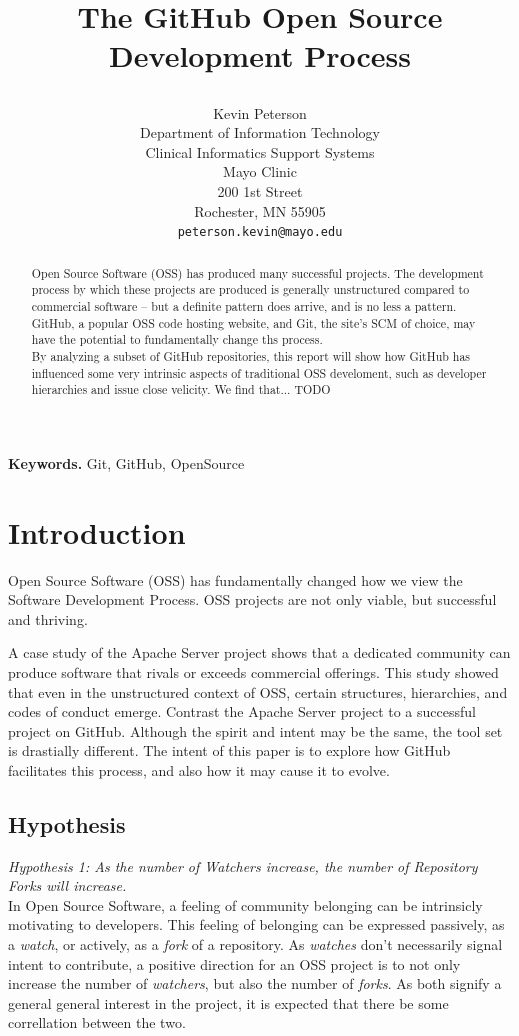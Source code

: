 \documentclass{proc}
\title{
The GitHub Open Source Development Process
\author{Kevin Peterson\\
Department of Information Technology\\
Clinical Informatics Support Systems\\
Mayo Clinic\\
200 1st Street\\
Rochester, MN  55905\\
\small \texttt{peterson.kevin@mayo.edu}
}
}
\date{}
\begin{document}
\maketitle

\begin{abstract}
Open Source Software (OSS) has produced many successful projects. The development process by which these projects are produced is generally unstructured compared to commercial software -- but a definite pattern does arrive, and is no less a pattern. GitHub, a popular OSS code hosting website, and Git, the site's SCM of choice, may have the potential to fundamentally change ths process.\\
By analyzing a subset of GitHub repositories, this report will show how GitHub has influenced some very intrinsic aspects of traditional OSS develoment, such as developer hierarchies and issue close velicity. We find that... TODO
\end{abstract}

\noindent \textbf{Keywords.} Git, GitHub, OpenSource

\section{Introduction}
Open Source Software (OSS) has fundamentally changed how we view the Software Development Process\cite{raymond1999cathedral}. OSS projects are not only viable, but successful and thriving. 

A case study of the Apache Server project\cite{mockus2000case} shows that a dedicated community can produce software that rivals or exceeds commercial offerings. This study showed that even in the unstructured context of OSS, certain structures, hierarchies, and codes of conduct emerge. Contrast the Apache Server project to a successful project on GitHub. Although the spirit and intent may be the same, the tool set is drastially different. The intent of this paper is to explore how GitHub facilitates this process, and also how it may cause it to evolve.

\subsection{Hypothesis}
\emph{Hypothesis 1: As the number of Watchers increase, the number of Repository Forks will increase.}\\
In Open Source Software, a feeling of community belonging can be intrinsicly motivating to developers\cite{lakhani2003hackers}. This feeling of belonging can be expressed passively, as a \emph{watch}, or actively, as a \emph{fork} of a repository. As \emph{watches} don't necessarily signal intent to contribute, a positive direction for an OSS project is to not only increase the number of \emph{watchers}, but also the number of \emph{forks}. As both signify a general general interest in the project, it is expected that there be some correllation between the two.\\
\end{document}
